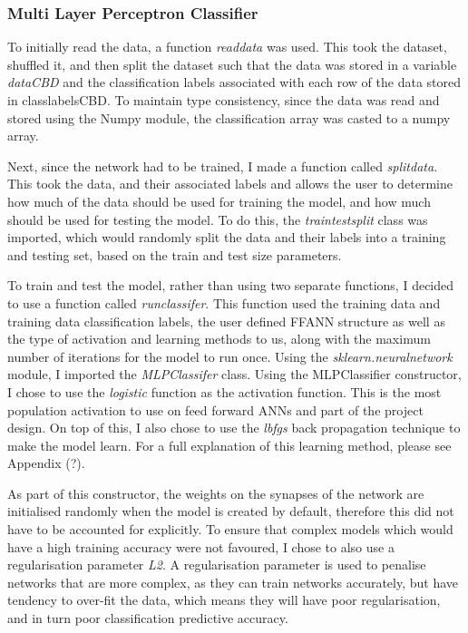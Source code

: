 \documentclass[11pt]{article}
\begin{document}
\subsubsection{Multi Layer Perceptron Classifier}\label{subsubsec:MLP}
To initially read the data, a function \textit{read\textunderscore data} was used. This took the dataset, shuffled it, and then split the dataset such that the data was stored in a variable \textit{data\textunderscore CBD} and the classification labels associated with each row of the data stored in {class\textunderscore labels\textunderscore CBD}. To maintain type consistency, since the data was read and stored using the Numpy module, the classification array was casted to a numpy array. 

Next, since the network had to be trained, I made a function called \textit{split\textunderscore data}. This took the data, and their associated labels and allows the user to determine how much of the data should be used for training the model, and how much should be used for testing the model. To do this, the \textit{train\textunderscore test\textunderscore split} class was imported, which would randomly split the data and their labels into a training and testing set, based on the train and test size parameters. 

To train and test the model, rather than using two separate functions, I decided to use a function called \textit{run\textunderscore classifer}. This function used the training data and training data classification labels, the user defined FFANN structure as well as the type of activation and learning methods to us, along with the maximum number of iterations for the model to run once. Using the \textit{sklearn.neural\textunderscore network} module, I imported the \textit{MLPClassifer} class. Using the MLPClassifier constructor, I chose to use the \textit{logistic} function as the activation function. This is the most population activation to use on feed forward ANNs and part of the project design. On top of this,  I also chose to use the \textit{lbfgs} back propagation technique to make the model learn. For a full explanation of this learning method, please see Appendix (?). 

As part of this constructor, the weights on the synapses of the network are initialised randomly when the model is created by default, therefore this did not have to be accounted for explicitly. 
To ensure that complex models which would have a high training accuracy were not favoured, I chose to also use a regularisation parameter \textit{L2}. A regularisation parameter is used to penalise networks that are more complex, as they can train networks accurately, but have tendency to over-fit the data, which means they will have poor regularisation, and in turn poor classification predictive accuracy. 
\end{document}
